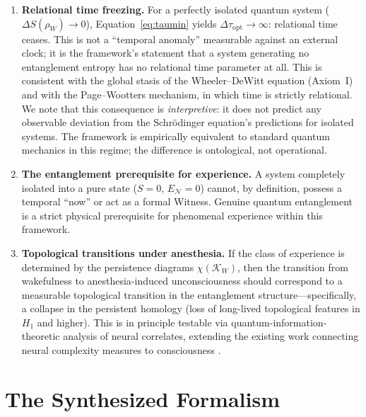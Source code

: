 \documentclass[12pt, a4paper]{article}
\begin{document}
\begin{enumerate}
    \item \textbf{Relational time freezing.} For a perfectly isolated quantum system ($\Delta S(\rho_W) \to 0$), Equation~\eqref{eq:taumin} yields $\Delta\tau_{\mathrm{opt}} \to \infty$: relational time ceases. This is not a ``temporal anomaly'' measurable against an external clock; it is the framework's statement that a system generating no entanglement entropy has no relational time parameter at all. This is consistent with the global stasis of the Wheeler--DeWitt equation (Axiom~I) and with the Page--Wootters mechanism, in which time is strictly relational. We note that this consequence is \emph{interpretive}: it does not predict any observable deviation from the Schr\"{o}dinger equation's predictions for isolated systems. The framework is empirically equivalent to standard quantum mechanics in this regime; the difference is ontological, not operational.
    
    \item \textbf{The entanglement prerequisite for experience.} A system completely isolated into a pure state ($S = 0$, $E_{\mathcal{N}} = 0$) cannot, by definition, possess a temporal ``now'' or act as a formal Witness. Genuine quantum entanglement is a strict physical prerequisite for phenomenal experience within this framework.
    
    \item \textbf{Topological transitions under anesthesia.} If the class of experience is determined by the persistence diagrams $\chi(\mathcal{K}_W)$, then the transition from wakefulness to anesthesia-induced unconsciousness should correspond to a measurable topological transition in the entanglement structure---specifically, a collapse in the persistent homology (loss of long-lived topological features in $H_1$ and higher). This is in principle testable via quantum-information-theoretic analysis of neural correlates, extending the existing work connecting neural complexity measures to consciousness \cite{Casali2013}.
\end{enumerate}

\section{The Synthesized Formalism}
\label{sec:synthesis}
\end{document}
